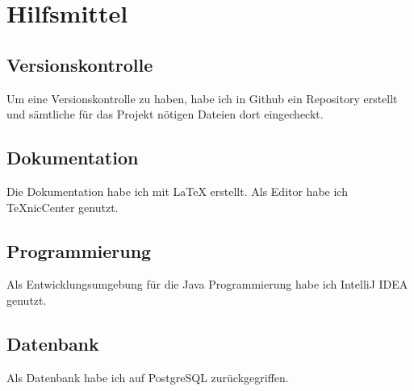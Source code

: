 \section{Hilfsmittel}

\subsection{Versionskontrolle}
Um eine Versionskontrolle zu haben, habe ich in Github \cite{Github} ein Repository erstellt und sämtliche für das Projekt nötigen Dateien dort eingecheckt.

\subsection{Dokumentation}
Die Dokumentation habe ich mit \LaTeX{} erstellt. Als Editor habe ich TeXnicCenter \cite{TeXnicCenter} genutzt.

\subsection{Programmierung}
Als Entwicklungsumgebung für die Java Programmierung habe ich IntelliJ IDEA \cite{IntelliJ} genutzt.

\subsection{Datenbank}
Als Datenbank habe ich auf PostgreSQL \cite{Postgres} zurückgegriffen.
